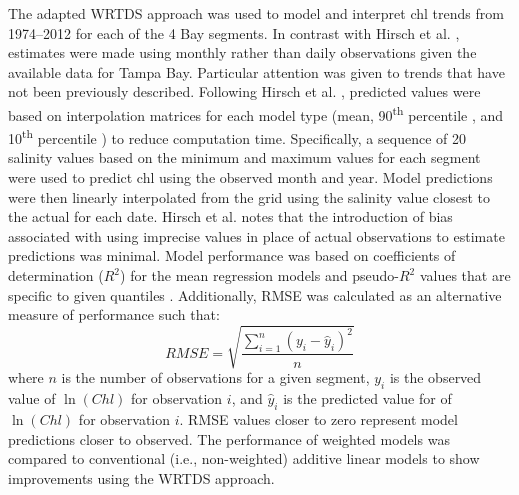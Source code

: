 \documentclass{svjour3}\usepackage[]{graphicx}\usepackage[]{color}
\newcommand{\nine}{90\textsuperscript{th} percentile }
\newcommand{\ten}{10\textsuperscript{th} percentile }
\begin{document}
The adapted \ac{WRTDS} approach was used to model and interpret \ac{chl} trends from 1974--2012 for each of the 4 Bay segments.  In contrast with Hirsch et al. \cite{Hirsch10}, estimates were made using monthly rather than daily observations given the available data for Tampa Bay.  Particular attention was given to trends that have not been previously described.  Following Hirsch et al. \cite{Hirsch10}, predicted values were based on interpolation matrices for each model type (mean, \nine, and \ten) to reduce computation time.  Specifically, a sequence of 20 salinity values based on the minimum and maximum values for each segment were used to predict \ac{chl} using the observed month and year.  Model predictions were then linearly interpolated from the grid using the salinity value closest to the actual for each date.  Hirsch et al. \cite{Hirsch10} notes that the introduction of bias associated with using imprecise values in place of actual observations to estimate predictions was minimal.  Model performance was based on coefficients of determination ($R^2$) for the mean regression models and pseudo-$R^2$ values that are specific to given quantiles \cite{Koenker99}.  Additionally, \ac{RMSE} was calculated as an alternative measure of performance such that:
\begin{equation}
RMSE = \sqrt {{\frac{{\sum\limits_{{i = 1}}^n {{{\left( {{y_i} - {{\hat{y}}_i}} \right)}^2}} }}{{n}}}}
\end{equation}
\noindent where $n$ is the number of observations for a given segment, $y_i$ is the observed value of $\ln\left(Chl\right)$ for observation $i$, and ${\hat{y}}_i$ is the predicted value for of $\ln\left(Chl\right)$ for observation $i$.  \ac{RMSE} values closer to zero represent model predictions closer to observed. The performance of weighted models was compared to conventional (i.e., non-weighted) additive linear models to show improvements using the \ac{WRTDS} approach.   
\end{document}
